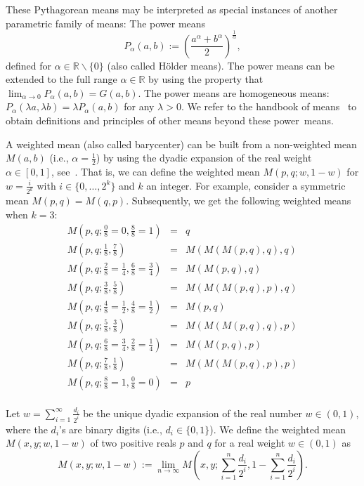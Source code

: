\documentclass[entropy,article,accept,oneauthor,pdftex,entropy]{Definitions/mdpi}
\def\bbR{\mathbb{R}}
\begin{document}
These Pythagorean means may be interpreted as special instances of another parametric family of means: 
The power means
\vspace{12pt}
\begin{equation}
P_\alpha(a,b) := \left(\frac{a^\alpha+b^\alpha}{2}\right)^{\frac{1}{\alpha}},
\end{equation}
defined for $\alpha\in\bbR\backslash\{0\}$ (also called H\"older means).
The power means can be extended to the full range $\alpha\in\bbR$ by using the property that 
$\lim_{\alpha\rightarrow 0} P_\alpha(a,b)=G(a,b)$. 
The power means are homogeneous means: $P_\alpha(\lambda a,\lambda b)=\lambda P_\alpha(a,b)$ for any $\lambda>0$.
We refer to the handbook of means~\cite{Bullen-2013}  to obtain definitions and principles of other means beyond these power~means.


A weighted mean (also called barycenter) can be built from a non-weighted mean $M(a,b)$ (i.e., $\alpha=\frac{1}{2}$)  by using the dyadic expansion of the real weight $\alpha\in [0,1]$, see~\cite{WeightedMean-2018}. 
That is, we can define the weighted mean $M(p,q;w,1-w)$ for $w=\frac{i}{2^k}$ with $i\in\{0,\ldots, 2^k\}$ and $k$ an integer.
For example, consider a symmetric mean $M(p,q)=M(q,p)$. Subsequently, we get the following weighted means  when $k=3$:
\begin{eqnarray*}
M\left(p,q;\frac{0}{8}=0,\frac{8}{8}=1\right)&=&q\\
M\left(p,q;\frac{1}{8},\frac{7}{8}\right)&=&M(M(M(p,q),q),q)\\
M\left(p,q;\frac{2}{8}=\frac{1}{4},\frac{6}{8}=\frac{3}{4}\right)&=&M(M(p,q),q)\\
M\left(p,q;\frac{3}{8},\frac{5}{8}\right)&=&M(M(M(p,q),p),q)\\
M\left(p,q;\frac{4}{8}=\frac{1}{2},\frac{4}{8}=\frac{1}{2}\right)&=& M(p,q)\\
M\left(p,q;\frac{5}{8},\frac{3}{8}\right) &=& M(M(M(p,q),q),p)\\
M\left(p,q;\frac{6}{8} = \frac{3}{4},\frac{2}{8}=\frac{1}{4}\right) &=& M(M(p,q),p)\\
M\left(p,q;\frac{7}{8},\frac{1}{8}\right) &=& M(M(M(p,q),p),p)\\
M\left(p,q;\frac{8}{8}=1,\frac{0}{8}=0\right) &=& p\\
\end{eqnarray*}

Let $w=\sum_{i=1}^\infty \frac{d_i}{2^i}$ be the unique dyadic expansion of the real number $w\in(0,1)$, where the $d_i$'s are binary digits (i.e., $d_i\in\{0,1\}$).
We define the weighted mean $M(x,y;w,1-w)$  of two positive reals $p$ and $q$ for a real weight $w\in (0,1)$ as
\begin{equation}
M(x,y;w,1-w) := \lim_{n\rightarrow\infty} M\left(x,y;\sum_{i=1}^n \frac{d_i}{2^i},1-\sum_{i=1}^n \frac{d_i}{2^i}\right).
\end{equation}
\end{document}
